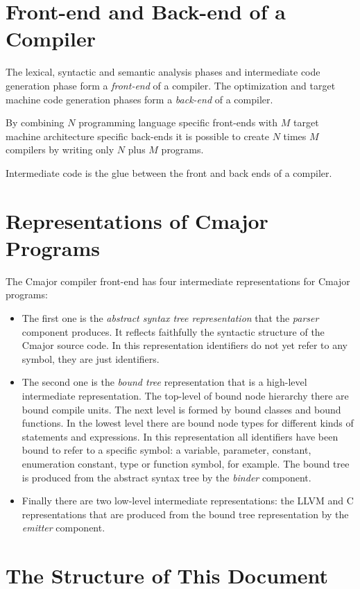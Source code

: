 \documentclass[a4paper,oneside,11pt]{book}
\theoremstyle{definition}
\begin{document}
\section{Front-end and Back-end of a Compiler}

The lexical, syntactic and semantic analysis phases and intermediate code generation phase
form a \emph{front-end} of a compiler. The optimization and target machine code generation phases
form a \emph{back-end} of a compiler.

By combining $N$ programming language specific front-ends with $M$ target machine architecture specific back-ends
it is possible to create $N$ times $M$ compilers by writing only $N$ plus $M$ programs.

Intermediate code is the glue between the front and back ends of a compiler.

\section{Representations of Cmajor Programs}\label{representations}

The Cmajor compiler front-end has four intermediate representations for Cmajor programs:
\begin{itemize}
\item
The first one is the \emph{abstract syntax tree representation} that the \emph{parser} component produces.
It reflects faithfully the syntactic structure of the Cmajor source code.
In  this representation identifiers do not yet refer to any symbol, they are just identifiers.
\item
The second one is the \emph{bound tree} representation that is a high-level intermediate representation.
The top-level of bound node hierarchy there are bound compile units.
The next level is formed by bound classes and bound functions. In the lowest level there are bound node types for different kinds of statements and expressions.
In this representation all identifiers have been bound to refer to a specific symbol:
a variable, parameter, constant, enumeration constant, type or function symbol, for example.
The bound tree is produced from the abstract syntax tree by the \emph{binder} component.
\item
Finally there are two low-level intermediate representations: the LLVM and C representations that are produced from the bound tree representation by
the \emph{emitter} component.
\end{itemize}

\section{The Structure of This Document}
\end{document}
